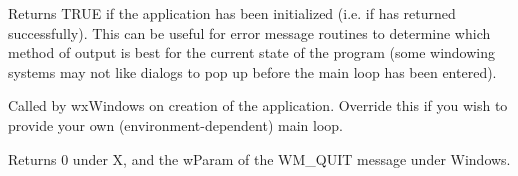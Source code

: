 \label{wxappinitialized}


Returns TRUE if the application has been initialized (i.e. if\rtfsp
{} has returned successfully).  This can be useful for error
message routines to determine which method of output is best for the
current state of the program (some windowing systems may not like
dialogs to pop up before the main loop has been entered).

\label{wxappmainloop}


Called by wxWindows on creation of the application. Override this if you wish
to provide your own (environment-dependent) main loop.


Returns 0 under X, and the wParam of the WM\_QUIT message under Windows.


\label{wxapponassert}


